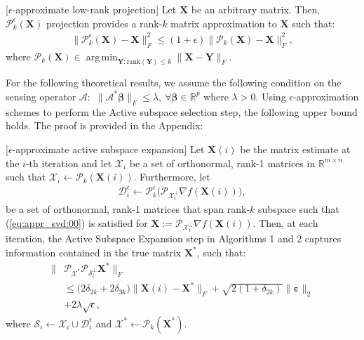 \documentclass[twocolumn]{svjour3}
\newcommand{\vectornorm}[1]{\|#1\|}
\newcommand{\vectornormbig}[1]{\big\|#1\big\|}
\newcommand{\sensing}{\boldsymbol{\mathcal{A}}}
\newcommand{\signal}{\boldsymbol{X}}
\newcommand{\bestsignal}{\boldsymbol{X}^\ast}
\newcommand{\noise}{\boldsymbol{\varepsilon}}
\newcommand{\dimension}{m \times n}
\newcommand{\rank}{k}
\DeclareMathOperator*{\argmin}{arg\,min}
\begin{document}
\begin{definition}{\label{def:appr_svd}}[$ \epsilon $-approximate low-rank projection]
Let $ \signal $ be an arbitrary matrix. Then, $ \mathcal{P}_{\rank}^{\epsilon}(\signal) $ projection provides a rank-$ \rank $ matrix approximation to $ \signal $ such that:
\begin{align}
\vectornormbig{\mathcal{P}_{\rank}^{\epsilon}(\signal) - \boldsymbol{X}}_F^2 \leq (1 + \epsilon) \vectornormbig{\mathcal{P}_{\rank}(\signal) - \boldsymbol{X}}_F^2, \label{eq:appr_svd:00}
\end{align} where $ \mathcal{P}_{\rank}(\signal) \in \argmin_{\boldsymbol{Y}: \text{rank}(\boldsymbol{Y}) \leq \rank} \vectornorm{\signal - \boldsymbol{Y}}_F $.
\end{definition}

For the following theoretical results, we assume the following condition on the sensing operator $\sensing:$ $\vectornormbig{\sensing^{\ast} \boldsymbol{\beta}}_F \leq \lambda, ~\forall \boldsymbol{\beta} \in \mathbb{R}^{p}$ where $\lambda > 0$. 
Using $ \epsilon $-approximation schemes to perform the Active subspace selection step, the following upper bound holds. The proof is provided in the Appendix:

\begin{lemma}\label{lemma:appr_act_subspace_exp}[$ \epsilon $-approximate active subspace expansion] Let $ \signal(i) $ be the matrix estimate at the $ i $-th iteration and let $ \mathcal{X}_i $ be a set of orthonormal, rank-1 matrices in $\mathbb{R}^{\dimension}$ such that $ \mathcal{X}_i \leftarrow \mathcal{P}_{\rank}(\signal(i)) $. Furthermore, let 
\begin{align}
\mathcal{D}_i^{\epsilon} \leftarrow \mathcal{P}_{\rank}^{\epsilon}\big( \mathcal{P}_{\mathcal{X}_i^{\bot}} \nabla f(\signal(i)) \big), \nonumber 
\end{align} be a set of orthonormal, rank-1 matrices that span rank-$ \rank $ subspace such that (\ref{eq:appr_svd:00}) is satisfied for $ \boldsymbol{X} := \mathcal{P}_{\mathcal{X}_i^{\bot}} \nabla f(\signal(i)) $. Then, at each iteration, the Active Subspace Expansion step in Algorithms 1 and 2 captures information contained in the true matrix $ \bestsignal $, such that:
\begin{align}
\vectornormbig{&\mathcal{P}_{\mathcal{X}^\ast} \mathcal{P}_{\mathcal{S}_i^{\bot}}\bestsignal}_F \nonumber \\
&\leq \big(2\delta_{2\rank} + 2\delta_{3\rank}\big)\vectornormbig{\signal(i) - \bestsignal}_F + \sqrt{2(1+\delta_{2\rank})}\vectornormbig{\noise}_2 \nonumber \\ &+ 2\lambda \sqrt{\epsilon}, \label{eq:lemma6_appr}
\end{align} where $ \mathcal{S}_i \leftarrow \mathcal{X}_i \cup \mathcal{D}_i^{\epsilon} $ and $ \mathcal{X}^\ast \leftarrow \mathcal{P}_{\rank}(\bestsignal) $. 
\end{lemma}
\end{document}
